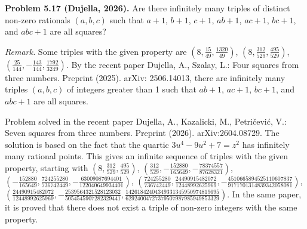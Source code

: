 \textbf{Problem 5.17 (Dujella, 2026).} Are there infinitely many triples of distinct non-zero rationals $(a,b,c)$ such that $a+1$, $b+1$, $c+1$, $ab+1$, $ac+1$, $bc+1$, and $abc+1$ are all squares?

\medskip

\textit{Remark.} Some triples with the given property are $(8, \frac{15}{49}, \frac{1320}{49})$, $(8, \frac{312}{529}, \frac{495}{529})$, $(\frac{25}{144}, -\frac{143}{144}, \frac{1792}{3249})$. By the recent paper Dujella, A., Szalay, L.: Four squares from three numbers. Preprint (2025). arXiv: 2506.14013, there are infinitely many triples $(a,b,c)$ of integers greater than 1 such that $ab+1$, $ac+1$, $bc+1$, and $abc+1$ are all squares.

Problem solved in the recent paper Dujella, A., Kazalicki, M., Petričević, V.: Seven squares from three numbers. Preprint (2026). arXiv:2604.08729. The solution is based on the fact that the quartic $3u^4-9u^2+7=z^2$ has infinitely many rational points. This gives an infinite sequence of triples with the given property, starting with
$(8,\frac{312}{529},\frac{495}{529})$,
$(\frac{312}{529},-\frac{152880}{165649},-\frac{78374557}{87628321})$,
$(-\frac{152880}{165649},\frac{724255280}{736742449},-\frac{63009087694401}{122040649934401})$,
$(\frac{724255280}{736742449},\frac{24490915482072}{12448992625969},-\frac{4510665894525110607837}{9171701314839342058081})$,
$(\frac{24490915482072}{12448992625969},-\frac{2539564321528123032}{5054545907282329441},\frac{14261842404349331345950974819695}{62924004727379507987985949853329})$.
In the same paper, it is proved that there does not exist a triple of non-zero integers with the same property.
